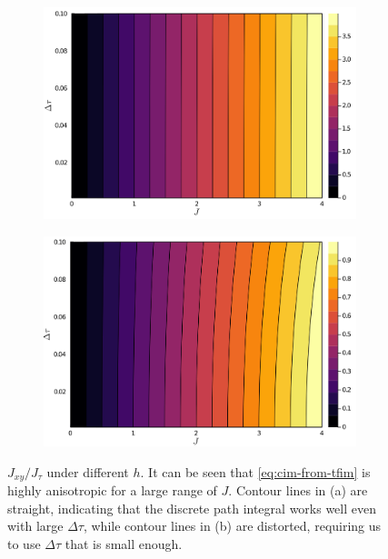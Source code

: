 \documentclass[hyperref, a4paper]{article}
\begin{document}
\begin{figure}
    \centering
    \begin{subfigure}{0.48\textwidth}
        \includegraphics[width=\textwidth]{montecarlo/ratio-h=1.PNG}
    \end{subfigure}
    \begin{subfigure}{0.48\textwidth}
        \includegraphics[width=\textwidth]{montecarlo/ratio-h=4.PNG}
    \end{subfigure}
    \caption{$J_{xy} / J_\tau$ under different $h$. 
    It can be seen that \eqref{eq:cim-from-tfim} is highly anisotropic for a large range of $J$.
    Contour lines in (a) are straight, indicating that the discrete path integral works well even with large $\Delta \tau$, 
    while contour lines in (b) are distorted, requiring us to use $\Delta \tau$ that is small enough.}
    \label{fig:jxy-jtau-ratio}
\end{figure}
\end{document}
